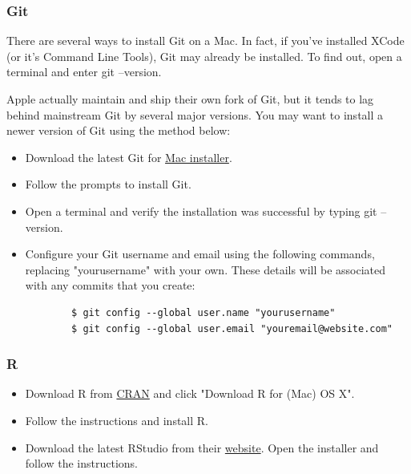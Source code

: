 \documentclass[11pt]{article} %
\begin{document}
    \subsubsection{Git}
    
      There are several ways to install Git on a Mac. 
      In fact, if you've installed XCode (or it's Command Line Tools), Git may already be installed. 
      To find out, open a terminal and enter git --version. 
      
      Apple actually maintain and ship their own fork of Git, but it tends to lag behind mainstream Git by several major versions. 
      You may want to install a newer version of Git using the method below:
      \begin{itemize}
        \item Download the latest Git for \href{https://git-scm.com/download/mac}{Mac installer}. 
        \item Follow the prompts to install Git. 
        \item Open a terminal and verify the installation was successful by typing git --version. 
        \item Configure your Git username and email using the following commands, replacing "yourusername" with your own. 
        These details will be associated with any commits that you create:
        \begin{lstlisting}
        $ git config --global user.name "yourusername"
        $ git config --global user.email "youremail@website.com"
        \end{lstlisting}
      \end{itemize}
    
    \subsubsection{R}
    
      \begin{itemize}
        \item Download R from \href{http://cran.us.r-project.org/}{CRAN} and click "Download R for (Mac) OS X". 
        \item Follow the instructions and install R. 
        \item Download the latest RStudio from their \href{https://www.rstudio.com/products/rstudio/download/}{website}. 
        Open the installer and follow the instructions. 
      \end{itemize}




\end{document}
